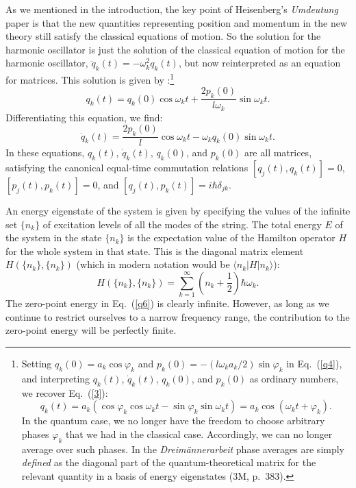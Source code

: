 \documentclass{elsart}
\begin{document}
As we mentioned in the introduction, the key point of Heisenberg's {\it Umdeutung} paper is that the new quantities representing position and momentum in the new theory still satisfy the classical equations of motion. So the solution for the harmonic oscillator is just the solution of the classical equation of motion for the harmonic oscillator, $\ddot{q}_k(t) = - \omega_k^2 q_k(t)$, but now reinterpreted as an equation for matrices. This solution is given by \citep[p.\ 139, Eq.\ (530)]{Baym 1969}:\footnote{Setting $q_k(0) = a_k \cos{\varphi_k}$ and $p_k(0) = - (l \omega_k a_k/2) \sin{\varphi_k}$ in Eq.\ (\ref{q4}), and 
interpreting $q_k(t)$, $\dot{q}_k(t)$, $q_k(0)$, and $p_k(0)$ as ordinary numbers, we recover Eq.\ (\ref{3}):
$$
q_k(t)  = a_k \left( \cos{\varphi_k}  \cos{ \omega_k t}  -  \sin{\varphi_k} \sin{ \omega_k t}  \right) = a_k \cos{(\omega_k t + \varphi_k)}.
$$
In the quantum case, we no longer have the freedom to choose arbitrary phases $\varphi_k$ that we had in the classical case. Accordingly, we can no longer average over such phases. In the {\it Dreim\"annerarbeit} phase averages are simply {\it defined} as the diagonal part of the quantum-theoretical matrix for the relevant quantity in a basis of energy eigenstates (3M, p.\ 383).}
\begin{equation}
q_k(t)  =  q_k(0) \cos{ \omega_k t}  +  \frac{2p_k(0)}{l \omega_k}  \sin{ \omega_k t}.
\label{q4}
\end{equation}
Differentiating this equation, we find:
\begin{equation}
\dot{q}_k(t)  =  \frac{2p_k(0)}{l}  \cos{ \omega_k t}  -  \omega_k q_k(0) \sin{ \omega_k t}.
\label{q4a}
\end{equation}
In these equations, $q_k(t)$, $\dot{q}_k(t)$, $q_k(0)$, and $p_k(0)$ are all matrices, satisfying the canonical equal-time commutation relations $[q_j(t), q_k(t)] = 0$, $[p_j(t), p_k(t)] = 0$, and $[q_j(t), p_k(t)] = i \hbar \delta_{jk}$. 

An energy eigenstate of the system is given by specifying the values of the infinite set $\{n_k\}$ of excitation levels  of all the modes of the string. The total energy $E$ of the system in the state $\{n_k\}$ is the expectation value of the Hamilton operator $H$ for the whole system in that state. This is the diagonal matrix element $H(\{n_k\}, \{n_k\})$ (which in modern notation would be $\langle n_k | H | n_k \rangle$):
\begin{equation}
H(\{n_k\}, \{n_k\}) = \sum_{k=1}^\infty \left( n_k + \frac{1}{2} \right)  \hbar \omega_k.
\label{q6}
\end{equation}
The zero-point energy in Eq.\ (\ref{q6}) is clearly infinite. However, as long as we continue to restrict ourselves to a narrow frequency range, the contribution to the zero-point energy will be perfectly finite.
\end{document}

